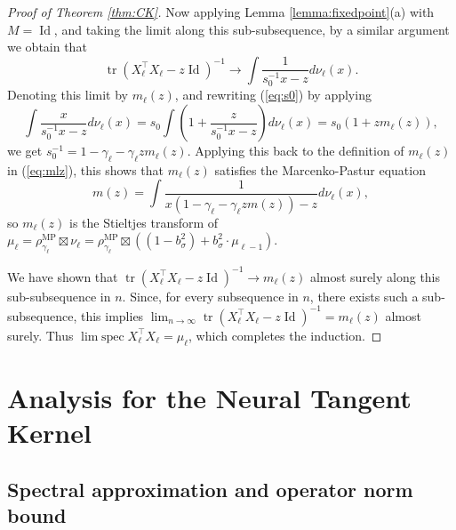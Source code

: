 \documentclass{article}
\theoremstyle{definition}
\newcommand{\Id}{\operatorname{Id}}
\newcommand{\MP}{\text{MP}}
\newcommand{\tr}{\operatorname{tr}}
\newcommand{\1}{\mathbf{1}}
\newcommand{\limspec}{\operatorname{lim\;spec}}
\begin{document}
\begin{proof}[Proof of Theorem \ref{thm:CK}]
Now applying Lemma \ref{lemma:fixedpoint}(a) with $M=\Id$, and taking the limit
along this sub-subsequence, by a similar argument
we obtain that
\begin{equation}\label{eq:mlz}
\tr (X_\ell^\top X_\ell-z\Id)^{-1} \to
\int \frac{1}{s_0^{-1}x-z}d\nu_\ell(x).
\end{equation}
Denoting this limit by $m_\ell(z)$, and rewriting (\ref{eq:s0}) by applying
\[\int \frac{x}{s_0^{-1}x-z}d\nu_\ell(x)
=s_0\int \left(1+\frac{z}{s_0^{-1}x-z}\right)d\nu_\ell(x)=s_0(1+zm_\ell(z)),\]
we get $s_0^{-1}=1-\gamma_\ell-\gamma_\ell zm_\ell(z)$. Applying this back to
the definition of $m_\ell(z)$ in (\ref{eq:mlz}), this shows that $m_\ell(z)$
satisfies the Marcenko-Pastur equation
\[m(z)=\int \frac{1}{x(1-\gamma_\ell-\gamma_\ell z m(z))-z}d\nu_\ell(x),\]
so $m_\ell(z)$ is the Stieltjes transform of
$\mu_\ell=\rho_{\gamma_\ell}^\MP \boxtimes \nu_\ell
=\rho_{\gamma_\ell}^\MP \boxtimes ((1-b_\sigma^2)+b_\sigma^2
\cdot \mu_{\ell-1})$.

We have shown that $\tr (X_\ell^\top X_\ell-z\Id)^{-1} \to m_\ell(z)$ almost
surely along this sub-subsequence in $n$. Since, for every subsequence in $n$,
there exists such a sub-subsequence, this implies
$\lim_{n \to \infty} \tr (X_\ell^\top X_\ell-z\Id)^{-1}=m_\ell(z)$ almost
surely. Thus $\limspec X_\ell^\top X_\ell=\mu_\ell$,
which completes the induction.
\end{proof}

\section{Analysis for the Neural Tangent Kernel}\label{appendix:NTK}

\subsection{Spectral approximation and
operator norm bound}\label{appendix:NTKapprox}
\end{document}

